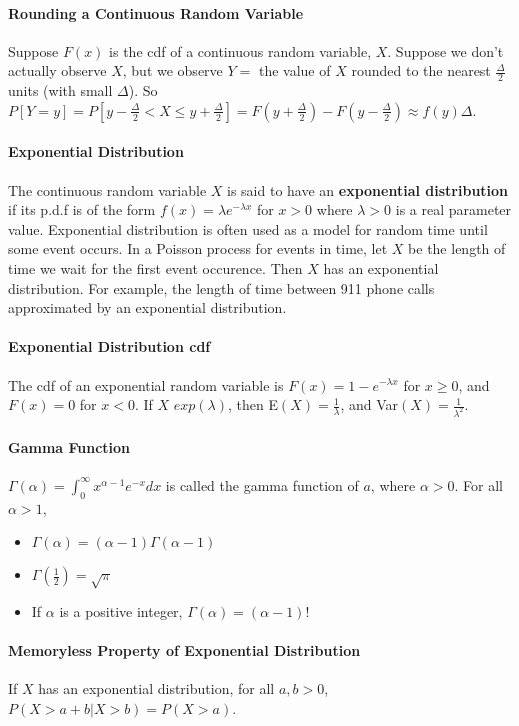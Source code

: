\documentclass[10pt,letter]{article}
\begin{document}
\paragraph{Rounding a Continuous Random Variable} Suppose $F(x)$ is the cdf of a continuous random variable, $X$. Suppose we don't actually observe $X$, but we observe $Y=$ the value of $X$ rounded to the nearest $\frac{\Delta}{2}$ units (with small $\Delta$). So $P[Y=y]=P[y-\frac{\Delta}{2}<X\leq y+\frac{\Delta}{2}] = F(y+\frac{\Delta}{2}) - F(y-\frac{\Delta}{2})\approx f(y)\Delta$.

\paragraph{Exponential Distribution} The continuous random variable $X$ is said to have an \textbf{exponential distribution} if its p.d.f is of the form $f(x)=\lambda e^{-\lambda x}$ for $x>0$ where $\lambda>0$ is a real parameter value. Exponential distribution is often used as a model for random time until some event occurs. In a Poisson process for events in time, let $X$ be the length of time we wait for the first event occurence. Then $X$ has an exponential distribution. For example, the length of time between 911 phone calls approximated by an exponential distribution. 

\paragraph{Exponential Distribution cdf} The cdf of an exponential random variable is $F(x) = 1 - e^{-\lambda x}$ for $x\geq 0$, and $F(x) = 0$ for $x<0$. If $X\text{~}exp(\lambda)$, then E$(X)=\frac{1}{\lambda}$, and Var$(X)=\frac{1}{\lambda^2}$.

\paragraph{Gamma Function} $\Gamma(\alpha)=\int_{0}^{\infty}x^{\alpha-1}e^{-x}dx$ is called the gamma function of $a$, where $\alpha>0$. For all $\alpha>1$,
\begin{itemize}
    \item $\Gamma(\alpha)=(\alpha-1)\Gamma(\alpha-1)$
    \item $\Gamma(\frac{1}{2})=\sqrt{\pi}$
    \item If $\alpha$ is a positive integer, $\Gamma(\alpha)=(\alpha-1)!$
\end{itemize}

\paragraph{Memoryless Property of Exponential Distribution} If $X$ has an exponential distribution, for all $a,b>0$, $P(X>a+b|X>b)=P(X>a)$. 
\end{document}
